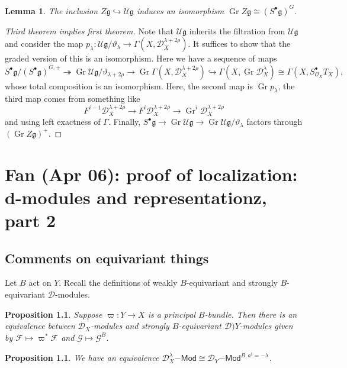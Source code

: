 \documentclass[leqno, openany]{memoir}
\newtheorem{prop}[thm]{Proposition}
\newtheorem{lem}[thm]{Lemma}
\theoremstyle{definition}
\theoremstyle{remark}
\theoremstyle{plain}
\theoremstyle{definition}
\theoremstyle{remark}
\newcommand{\U}{\mathcal{U}}
\newcommand{\g}{\mathfrak{g}}
\newcommand{\mc}[1]{\mathcal{#1}}
\newcommand{\on}[1]{\operatorname{#1}}
\newcommand{\ms}[1]{\mathsf{#1}}
\begin{document}
\begin{lem}
    The inclusion $Z \g \hookrightarrow \U \g$ induces an isomorphism $\on{Gr} Z \g \cong (S^{\bullet} \g)^G$.
\end{lem}
    
\begin{proof}[Third theorem implies first theorem]
    Note that $\U \g$ inherits the filtration from $\U \g$ and consider the map $p_{\lambda} \colon \U \g/\vartheta_{\lambda} \to \Gamma(X, \mc{D}_X^{\lambda + 2\rho})$. It suffices to show that the graded version of this is an isomorphism. Here we have a sequence of maps
    \[ S^{\bullet} \g/ (S^{\bullet} \g)^{G,+} \twoheadrightarrow \on{Gr} \U \g/\vartheta_{\lambda+2\rho} \to \on{Gr} \Gamma(X, \mc{D}_X^{\lambda + 2\rho}) \hookrightarrow \Gamma(X, \on{Gr} \mc{D}_X^{\lambda}) \cong \Gamma(X, S^{\bullet}_{\mc{O}_X} T_X), \]
    whose total composition is an isomorphism. Here, the second map is $\on{Gr} p_{\lambda}$, the third map comes from something like
    \[ F^{i-1} \mc{D}_X^{\lambda + 2\rho} \to F^i \mc{D}_X^{\lambda + 2\rho} \to \on{Gr}^i \mc{D}_X^{\lambda + 2\rho} \]
    and using left exactness of $\Gamma$. Finally, $S^{\bullet} \g \to \on{Gr} \U \g \to \on{Gr} \U \g / \vartheta_{\lambda}$ factors through $(\on{Gr} Z \g)^+$.
\end{proof}

\chapter{Fan (Apr 06): proof of localization: d-modules and representationz, part 2}%

\section{Comments on equivariant things}

Let $B$ act on $Y$. Recall the definitions of weakly $B$-equivariant and strongly $B$-equivariant $\mc{D}$-modules.

\begin{prop}
    Suppose $\varpi \colon Y \to X$ is a principal $B$-bundle. Then there is an equivalence between $\mc{D}_X$-modules and strongly $B$-equivariant $\mc{D})Y$-modules given by $\mc{F} \mapsto \varpi^* \mc{F}$ and $\mc{G} \mapsto \mc{G}^B$.
\end{prop}

\begin{prop}
    We have an equivalence $\mc{D}_X^{\lambda}\ms{-Mod} \cong \mc{D}_Y\ms{-Mod}^{B, a^{\natural} = -\lambda}$.
\end{prop}
\end{document}
